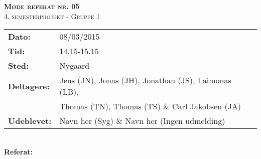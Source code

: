 
\newcommand{\HRule}{\rule{\linewidth}{0.1mm}}


	\begin{center}
		{\huge \bfseries \textsc{Møde referat nr. 05}}\\
		\textsc{\large 4. semesterprojekt - Gruppe 1}\\[0.3cm]
	\end{center}
	\begin{tabular}{ll}
	\large \textbf{Dato:} & 08/03/2015  \\ %
	\large \textbf{Tid:}  & 14.15-15.15 \\ %
	\large \textbf{Sted:} & Nygaard		\\ %
	\large \textbf{Deltagere:} & Jens (JN), Jonas (JH), Jonathan (JS), Laimonas (LB), \\
	\large \textbf & Thomas (TN),  Thomas (TS) \& Carl Jakobsen (JA)\\
	\large \textbf{Udeblevet:} & Navn her (Syg) \& Navn her (Ingen udmelding)	\\
	\end{tabular}\\
	\phantom{\,}\hspace{0.1em} \large \textbf{Referat:}
